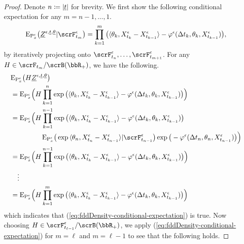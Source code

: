 \begin{proof}
  \label{proof:proposition:twists}
  Denote $n \coloneqq |\underline t|$ for brevity.
  We first show the following conditional expectation for any $m = n-1,\ldots, 1$.
  \begin{equation}
    \label{eq:fddDensity-conditional-expectation}
    \Exp_{\Prb^\epsilon_\stateVar}\big(\fddDensity^{\epsilon,\underline t, \underline\twistVar} | \scrF^\epsilon_{t_m} \big) = \prod_{k=1}^m \big( \prj{\twistVar_k}{\Xee_{t_k}-\Xee_{t_{k-1}}} - \affShift^\epsilon(\Delta t_k, \twistVar_k, \Xee_{t_{k-1}})\big),
  \end{equation}
  by iteratively projecting onto $\scrF^\epsilon_{t_n}, \ldots, \scrF^\epsilon_{t_{m+1}}$.
  For any $H \in \scrF_{t_m}/\scrB(\bbR_+)$, we have the following.
  \begin{align*}
    &\Exp_{\Prb^\epsilon_\stateVar}\big(H \fddDensity^{\epsilon,\underline t, \underline\twistVar} \big) \\
    &= \Exp_{\Prb^\epsilon_\stateVar}\Big( H \prod_{k=1}^n \exp\big(  \prj{\twistVar_k}{\Xee_{t_k}-\Xee_{t_{k-1}}} - \affShift^\epsilon(\Delta t_k, \twistVar_k, \Xee_{t_{k-1}})\big) \Big)  \\
    &= \Exp_{\Prb^\epsilon_\stateVar}\Big( \begin{aligned}[t]
      &H \prod_{k=1}^{n-1} \exp\big(  \prj{\twistVar_k}{\Xee_{t_k}-\Xee_{t_{k-1}}} - \affShift^\epsilon(\Delta t_k, \twistVar_k, \Xee_{t_{k-1}})\big)  \\
      &\quad\Exp_{\Prb^\epsilon_\stateVar}\big( \exp\prj{\twistVar_n}{\Xee_{t_n}-\Xee_{t_{n-1}}} | \scrF^\epsilon_{t_{n-1}}\big)\exp\big(-\affShift^\epsilon(\Delta t_n, \twistVar_n, \Xee_{t_{n-1}})\big) \Big)  
    \end{aligned}\\
    &= \Exp_{\Prb^\epsilon_\stateVar}\Big( H \prod_{k=1}^{n-1} \exp\big(  \prj{\twistVar_k}{\Xee_{t_k}-\Xee_{t_{k-1}}} - \affShift^\epsilon(\Delta t_k, \twistVar_k, \Xee_{t_{k-1}})\big) \Big) \\
    &\quad\vdots \\
    &= \Exp_{\Prb^\epsilon_\stateVar}\Big( H \prod_{k=1}^m \exp\big(  \prj{\twistVar_k}{\Xee_{t_k}-\Xee_{t_{k-1}}} - \affShift^\epsilon(\Delta t_k, \twistVar_k, \Xee_{t_{k-1}})\big) \Big)
  \end{align*}
  which indicates that (\ref{eq:fddDensity-conditional-expectation}) is true.
  Now choosing $H \in \scrF^\epsilon_{t_{\ell-1}}/\scrB(\bbR_+)$, we apply (\ref{eq:fddDensity-conditional-expectation}) for $m=\ell$ and $m=\ell-1$ to see that the following holds.

\end{proof}
